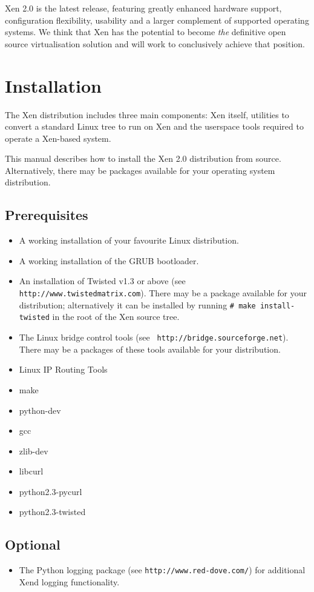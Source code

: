 \documentclass[11pt,twoside,final,openright]{xenstyle}
\begin{document}
Xen 2.0 is the latest release, featuring greatly enhanced hardware
support, configuration flexibility, usability and a larger complement
of supported operating systems.  We think that Xen has the potential
to become {\em the} definitive open source virtualisation solution and
will work to conclusively achieve that position.


\chapter{Installation}

The Xen distribution includes three main components: Xen itself,
utilities to convert a standard Linux tree to run on Xen and the
userspace tools required to operate a Xen-based system.

This manual describes how to install the Xen 2.0 distribution from
source.  Alternatively, there may be packages available for your
operating system distribution.

\section{Prerequisites}
\label{sec:prerequisites}
\begin{itemize}
\item A working installation of your favourite Linux distribution.
\item A working installation of the GRUB bootloader.
\item An installation of Twisted v1.3 or above (see {\tt
http://www.twistedmatrix.com}).  There may be a package available for
your distribution; alternatively it can be installed by running {\tt \#
make install-twisted} in the root of the Xen source tree.
\item The Linux bridge control tools (see {\tt
http://bridge.sourceforge.net}).  There may be a packages of these
tools available for your distribution.
\item Linux IP Routing Tools
\item make
\item python-dev
\item gcc
\item zlib-dev
\item libcurl
\item python2.3-pycurl
\item python2.3-twisted
\end{itemize}

\section{Optional}
\begin{itemize}
\item The Python logging package (see {\tt http://www.red-dove.com/})
for additional Xend logging functionality.
\end{itemize}
\end{document}
